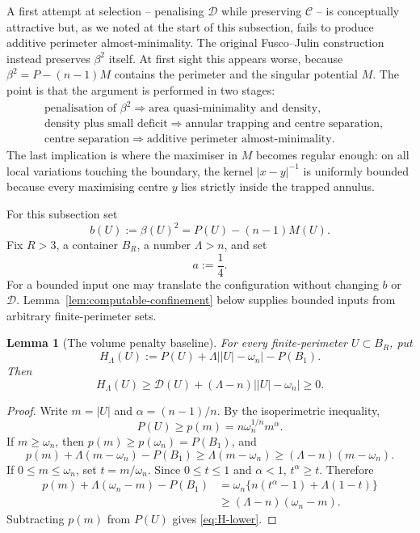 \documentclass[11pt]{amsart}
\newtheorem{lemma}[theorem]{Lemma}
\theoremstyle{definition}
\newcommand{\Per}{P}
\newcommand{\Def}{\mathcal D}
\begin{document}
A first attempt at selection -- penalising \(\Def\) while preserving
\(\mathcal C\) -- is conceptually attractive but, as we noted at the start
of this subsection, fails to produce additive perimeter almost-minimality.
The original Fusco--Julin construction \cite{FJ2014} instead preserves
\(\beta^2\) itself.  At first sight this appears worse, because
\(\beta^2=\Per-(n-1)M\) contains the perimeter and the singular potential
\(M\).  The point is that the argument is performed in two stages:
\[
\begin{split}
   &\text{penalisation of \(\beta^2\)}
   \Longrightarrow \text{area quasi-minimality and density},\\
   &\text{density plus small deficit}
   \Longrightarrow \text{annular trapping and centre separation},\\
   &\text{centre separation}
   \Longrightarrow \text{additive perimeter almost-minimality}.
\end{split}
\tag{4.49}\label{eq:regularising-chain}
\]
The last implication is where the maximiser in \(M\) becomes regular enough:
on all local variations touching the boundary, the kernel
\(|x-y|^{-1}\) is uniformly bounded because every maximising centre \(y\)
lies strictly inside the trapped annulus.

For this subsection set
\[
   b(U):=\beta(U)^2=\Per(U)-(n-1)M(U).
\tag{4.50}\label{eq:bU}
\]
Fix \(R>3\), a container \(B_R\), a number \(\Lambda>n\), and set
\[
   a:=\frac14.
\tag{4.51}\label{eq:a-quarter}
\]
For a bounded input one may translate the configuration without changing
\(b\) or \(\Def\).  Lemma~\ref{lem:computable-confinement} below supplies
bounded inputs from arbitrary finite-perimeter sets.

\begin{lemma}[The volume penalty baseline]\label{lem:volume-baseline}
For every finite-perimeter \(U\subset B_R\), put
\[
   H_\Lambda(U):=
   \Per(U)+\Lambda\bigl||U|-\omega_n\bigr|-\Per(B_1).
\tag{4.52}\label{eq:H-Lambda}
\]
Then
\[
   H_\Lambda(U)
   \ge \Def(U)+(\Lambda-n)\bigl||U|-\omega_n\bigr|
   \ge0.
\tag{4.53}\label{eq:H-lower}
\]
\end{lemma}

\begin{proof}
Write \(m=|U|\) and \(\alpha=(n-1)/n\).  By the isoperimetric inequality,
\[
   \Per(U)\ge p(m)=n\omega_n^{1/n}m^\alpha.
\]
If \(m\ge\omega_n\), then \(p(m)\ge p(\omega_n)=\Per(B_1)\), and
\[
   p(m)+\Lambda(m-\omega_n)-\Per(B_1)
   \ge\Lambda(m-\omega_n)
   \ge(\Lambda-n)(m-\omega_n).
\]
If \(0\le m\le\omega_n\), set \(t=m/\omega_n\).  Since
\(0\le t\le1\) and \(\alpha<1\), \(t^\alpha\ge t\).  Therefore
\[
\begin{aligned}
   p(m)+\Lambda(\omega_n-m)-\Per(B_1)
   &=\omega_n\{n(t^\alpha-1)+\Lambda(1-t)\}\\
   &\ge(\Lambda-n)(\omega_n-m).
\end{aligned}
\]
Subtracting \(p(m)\) from \(\Per(U)\) gives \eqref{eq:H-lower}.
\end{proof}
\end{document}
